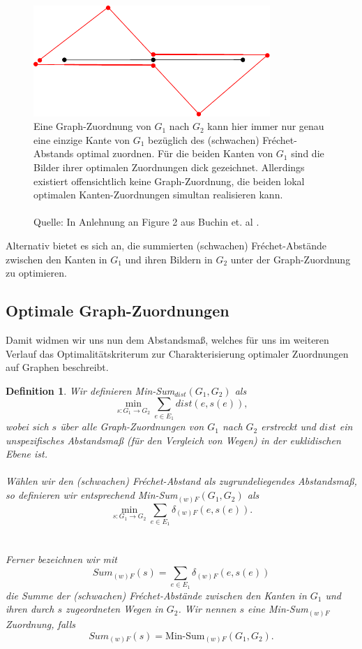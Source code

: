 \documentclass[a4paper, 12pt, twoside]{article}
\theoremstyle{Format1} %
\newtheorem{Def}{Definition}[section]       %
\begin{document}
\begin{figure}[H]
    \centering
    \includegraphics[width=0.8\textwidth]{chapter_2_example_0.pdf}
	\caption{Eine Graph-Zuordnung von $G_1$ nach $G_2$ kann hier immer nur genau eine einzige Kante von $G_1$ bezüglich des (schwachen) Fréchet-Abstands optimal zuordnen.
	Für die beiden Kanten von $G_1$ sind die Bilder ihrer optimalen Zuordnungen dick gezeichnet. Allerdings existiert offensichtlich keine Graph-Zuordnung,
	die beiden lokal optimalen Kanten-Zuordnungen simultan realisieren kann.
	\\
	\\
	Quelle: In Anlehnung an Figure 2 aus Buchin et. al \cite{Buchin}.
	}
    \label{chapter_2_example_0}
\end{figure}

Alternativ bietet es sich an, die summierten (schwachen) Fréchet-Abstände zwischen den Kanten in $G_1$ und ihren Bildern in $G_2$ unter der Graph-Zuordnung zu optimieren.

\subsection{Optimale Graph-Zuordnungen} \label{Optimale Graphzuordnungen}
Damit widmen wir uns nun dem Abstandsmaß, welches für uns im weiteren Verlauf das Optimalitätskriterum zur Charakterisierung optimaler Zuordnungen auf Graphen beschreibt.

\begin{Def} \label{Definition Min-Sum}
	Wir definieren \textit{Min-Sum}$_{dist}(G_1, G_2)$ als
	$$\min_{s: G_1 \to G_2} \sum_{e \in E_1} dist(e, s(e)),$$
	wobei sich $s$ über alle Graph-Zuordnungen von $G_1$ nach $G_2$ erstreckt und $dist$ ein unspezifisches Abstandsmaß (für den Vergleich von Wegen)
	in der euklidischen Ebene ist.
	\\
	\\
	Wählen wir den (schwachen) Fréchet-Abstand als zugrundeliegendes Abstandsmaß, so definieren wir entsprechend
	\textit{Min-Sum}$_{(w)F}(G_1, G_2)$ als $$\min_{s: G_1 \to G_2} \sum_{e \in E_1} \delta_{(w)F}(e, s(e)).$$
	\\
	\\
	Ferner bezeichnen wir mit
	$$Sum_{(w)F}(s) = \sum_{e \in E_1}\delta_{(w)F}(e, s(e))$$
	die Summe der (schwachen) Fréchet-Abstände zwischen den Kanten
	in $G_1$ und ihren durch $s$ zugeordneten Wegen in $G_2$.
	Wir nennen $s$ eine Min-Sum$_{(w)F}$ Zuordnung, falls
	$$Sum_{(w)F}(s) = \text{Min-Sum}_{(w)F}(G_1,G_2).$$
\end{Def}
\end{document}
